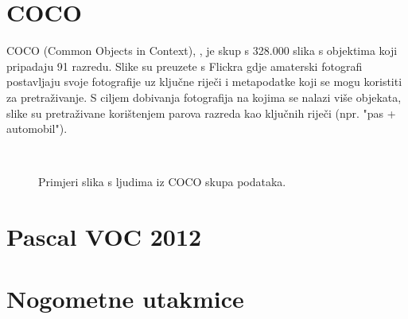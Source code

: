 \section{COCO}
COCO (Common Objects in Context), \cite{DBLP:journals/corr/LinMBHPRDZ14}, je skup s 328.000 slika s objektima koji pripadaju 91 razredu. Slike su preuzete s Flickra gdje amaterski fotografi postavljaju svoje fotografije uz ključne riječi i metapodatke koji se mogu koristiti za pretraživanje. S ciljem dobivanja fotografija na kojima se nalazi više objekata, slike su pretraživane korištenjem parova razreda kao ključnih riječi (npr. "pas + automobil").

\begin{figure}[h]
 \
 \
\caption{Primjeri slika s ljudima iz COCO skupa podataka.}
\end{figure}

\section{Pascal VOC 2012}
	
\section{Nogometne utakmice}